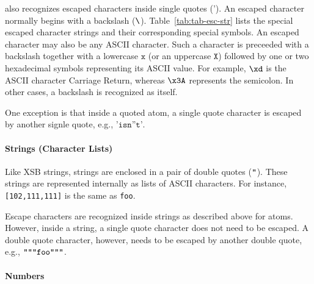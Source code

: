 \documentclass[11pt]{report}
\begin{document}
\FLORA also recognizes escaped characters inside single quotes
($\texttt{'}$).  An escaped character normally begins with a backslash
($\texttt{\bksl}$).  Table~\ref{tab:tab-esc-str} lists the special escaped
character strings and their corresponding special symbols. An escaped
character may also be any ASCII character. Such a character is preceeded
with a backslash together with a lowercase $\texttt{x}$ (or an uppercase
$\texttt{X}$) followed by one or two hexadecimal symbols representing its
ASCII value. For example, $\texttt{{\bksl}xd}$ is the ASCII character
Carriage Return, whereas $\texttt{{\bksl}x3A}$ represents the semicolon. In
other cases, a backslash is recognized as itself.

One exception is that inside a quoted atom, a single quote character is escaped by another
signle quote, e.g., $\texttt{'isn''t'}$.

\paragraph{Strings (Character Lists)}

Like XSB strings, \FLORA strings are enclosed in a pair of double quotes
($\texttt{{\dq}}$).  These strings are represented internally as lists of
ASCII characters. For instance, \mbox{\texttt{[102,111,111]}} is the same
as \texttt{{\dq}foo{\dq}}.

Escape characters are recognized inside \FLORA strings as described above
for \FLORA atoms.  However, inside a string, a single quote character does
not need to be escaped. A double quote character, however, needs to be
escaped by another double quote, e.g.,
$\texttt{{\dq}{\dq}{\dq}foo{\dq}{\dq}{\dq}}$.

\paragraph{Numbers}
\end{document}
